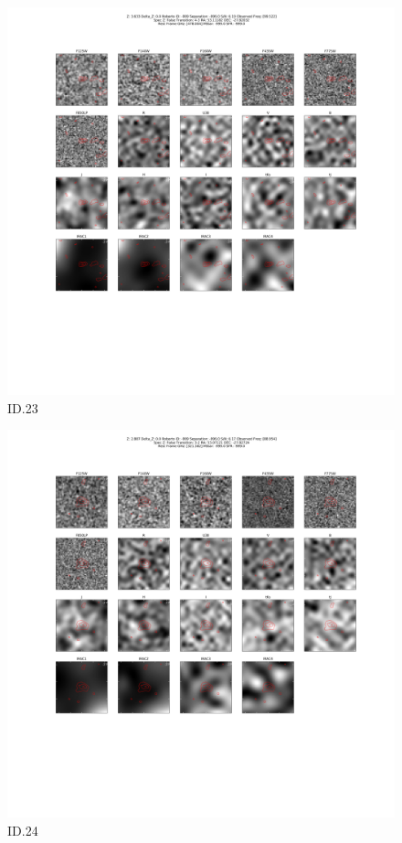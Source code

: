 \begin{figure}[tbp]
\centering \includegraphics[width=120mm]{Matched/ASPECS_Cutout_23.png}
\caption{ID.23}
\label{fig:Match_Three}
\end{figure}

\begin{figure}[tbp]
\centering \includegraphics[width=120mm]{Matched/ASPECS_Cutout_24.png}
\caption{ID.24}
\label{fig:Match_Three}
\end{figure}

